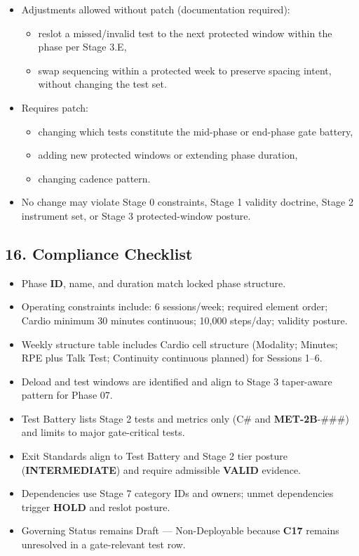 \documentclass[10pt]{article}
\begin{document}
\begin{itemize}
\item Adjustments allowed without patch (documentation required):
  \begin{itemize}
  \item reslot a missed/invalid test to the next protected window within the phase per Stage 3.E,
  \item swap sequencing within a protected week to preserve spacing intent, without changing the test set.
  \end{itemize}
\item Requires patch:
  \begin{itemize}
  \item changing which tests constitute the mid-phase or end-phase gate battery,
  \item adding new protected windows or extending phase duration,
  \item changing cadence pattern.
  \end{itemize}
\item No change may violate Stage 0 constraints, Stage 1 validity doctrine, Stage 2 instrument set, or Stage 3 protected-window posture.
\end{itemize}

\subsection*{16. Compliance Checklist}

\begin{itemize}
\item Phase \textbf{ID}, name, and duration match locked phase structure.
\item Operating constraints include: 6 sessions/week; required element order; Cardio minimum 30 minutes continuous; 10,000 steps/day; validity posture.
\item Weekly structure table includes Cardio cell structure (Modality; Minutes; RPE plus Talk Test; Continuity continuous planned) for Sessions 1–6.
\item Deload and test windows are identified and align to Stage 3 taper-aware pattern for Phase 07.
\item Test Battery lists Stage 2 tests and metrics only (C\# and \textbf{MET-2B}-\#\#\#) and limits to major gate-critical tests.
\item Exit Standards align to Test Battery and Stage 2 tier posture (\textbf{INTERMEDIATE}) and require admissible \textbf{VALID} evidence.
\item Dependencies use Stage 7 category IDs and owners; unmet dependencies trigger \textbf{HOLD} and reslot posture.
\item Governing Status remains Draft — Non-Deployable because \textbf{C17} remains unresolved in a gate-relevant test row.
\end{itemize}
\end{document}
